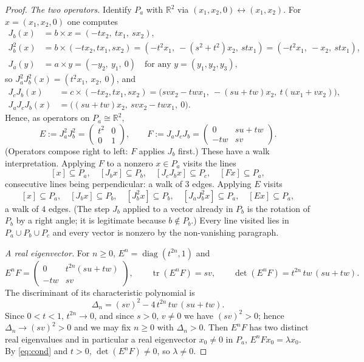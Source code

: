 \documentclass[11pt,a4paper]{article}
\theoremstyle{plain}
\theoremstyle{definition}
\theoremstyle{remark}
\newcommand{\R}{\mathbb R}
\newcommand{\Jm}[1]{J_{#1}}
\newcommand{\Pl}[1]{P_{#1}}
\begin{document}
\begin{proof}
\emph{The two operators.} Identify $\Pl a$ with $\R^2$ via $(x_1,x_2,0)\leftrightarrow(x_1,x_2)$. For $x=(x_1,x_2,0)$ one computes
\begin{align*}
\Jm b(x)&=b\times x=(-tx_2,\ tx_1,\ sx_2),\\
\Jm b^2(x)&=b\times(-tx_2,tx_1,sx_2)=(-t^2x_1,\ -(s^2+t^2)x_2,\ stx_1)=(-t^2x_1,\ -x_2,\ stx_1),\\
\Jm a(y)&=a\times y=(-y_2,\ y_1,\ 0)\quad\text{for any }y=(y_1,y_2,y_3),
\end{align*}
so $\Jm a^2\Jm b^2(x)=(t^2x_1,\ x_2,\ 0)$, and
\begin{align*}
\Jm c\Jm b(x)&=c\times(-tx_2,tx_1,sx_2)=\bigl(svx_2-twx_1,\ -(su+tw)x_2,\ t(ux_1+vx_2)\bigr),\\
\Jm a\Jm c\Jm b(x)&=\bigl((su+tw)x_2,\ svx_2-twx_1,\ 0\bigr).
\end{align*}
Hence, as operators on $\Pl a\cong\R^2$,
\begin{equation}\label{eq:EF}
E:=\Jm a^2\Jm b^2=\begin{pmatrix}t^2&0\\0&1\end{pmatrix},\qquad
F:=\Jm a\Jm c\Jm b=\begin{pmatrix}0&su+tw\\-tw&sv\end{pmatrix}.
\end{equation}
(Operators compose right to left: $F$ applies $\Jm b$ first.) These have a walk interpretation. Applying $F$ to a nonzero $x\in\Pl a$ visits the lines
\[
[x]\subseteq\Pl a,\quad [\Jm b x]\subseteq\Pl b,\quad [\Jm c\Jm b x]\subseteq\Pl c,\quad [Fx]\subseteq\Pl a,
\]
consecutive lines being perpendicular: a walk of $3$ edges. Applying $E$ visits
\[
[x]\subseteq\Pl a,\quad [\Jm b x]\subseteq\Pl b,\quad [\Jm b^2x]\subseteq\Pl b,\quad [\Jm a\Jm b^2x]\subseteq\Pl a,\quad [Ex]\subseteq\Pl a,
\]
a walk of $4$ edges. (The step $\Jm b$ applied to a vector already in $\Pl b$ is the rotation of $\Pl b$ by a right angle; it is legitimate because $b\notin\Pl b$.) Every line visited lies in $\Pl a\cup\Pl b\cup\Pl c$ and every vector is nonzero by the non-vanishing paragraph.

\emph{A real eigenvector.} For $n\ge0$, $E^n=\operatorname{diag}(t^{2n},1)$ and
\[
E^nF=\begin{pmatrix}0&t^{2n}(su+tw)\\-tw&sv\end{pmatrix},
\qquad
\operatorname{tr}(E^nF)=sv,\qquad \det(E^nF)=t^{2n}\,tw\,(su+tw).
\]
The discriminant of its characteristic polynomial is
\begin{equation}\label{eq:disc}
\Delta_n=(sv)^2-4\,t^{2n}\,tw\,(su+tw).
\end{equation}
Since $0<t<1$, $t^{2n}\to0$, and since $s>0$, $v\ne0$ we have $(sv)^2>0$; hence $\Delta_n\to(sv)^2>0$ and we may fix $n\ge0$ with $\Delta_n>0$. Then $E^nF$ has two distinct real eigenvalues and in particular a real eigenvector $x_0\ne0$ in $\Pl a$, $E^nFx_0=\lambda x_0$. By \eqref{eq:cond} and $t>0$, $\det(E^nF)\ne0$, so $\lambda\ne0$.


\end{proof}
\end{document}
